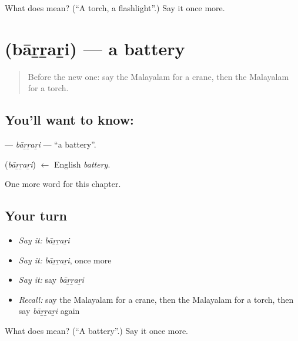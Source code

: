 \begin{tcolorbox}[breakable,colback=teal!4,colframe=teal!35!black,title={Before you move on}]
What does  mean? (\textquotedblleft{}A torch, a flashlight\textquotedblright{}.) Say it once more.
\end{tcolorbox}
\section[\texorpdfstring{\ml{ബാറ്ററി} (bāṟṟaṟi)}{ബാറ്ററി (bāṟṟaṟi)}]{ (bāṟṟaṟi) — a battery}

\label{lesson:ML-C214-barrari}



\begin{quote}
Before the new one: say the Malayalam for a crane, then the Malayalam for a torch.
\end{quote}

\subsection*{You'll want to know: }
\textbf{} — \emph{bāṟṟaṟi} — \textquotedblleft{}a battery\textquotedblright{}.

\begin{cousinweb}
\textbf{} (\emph{bāṟṟaṟi}) $\leftarrow$ English \emph{battery}.
\end{cousinweb}

\begin{grammarlens}[title={What you've built}]
One more word for this chapter.
\end{grammarlens}

\subsection*{Your turn}
\begin{itemize}
\raggedright
  \item \emph{Say it:} \emph{bāṟṟaṟi}
  \item \emph{Say it:} \emph{bāṟṟaṟi}, once more
  \item \emph{Say it:} say \emph{bāṟṟaṟi}
  \item \emph{Recall:} say the Malayalam for a crane, then the Malayalam for a torch, then say \emph{bāṟṟaṟi} again
\end{itemize}

\begin{tcolorbox}[breakable,colback=teal!4,colframe=teal!35!black,title={Before you move on}]
What does  mean? (\textquotedblleft{}A battery\textquotedblright{}.) Say it once more.
\end{tcolorbox}
